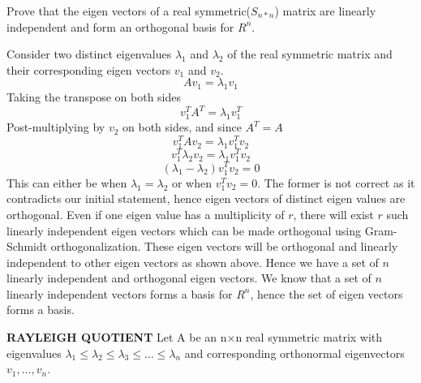 \documentclass[solution,addpoints,12pt]{exam}
\newenvironment{Solution}{\begin{solution}}{\end{solution}}
\begin{document}
\begin{questions}
\question Prove that the eigen vectors of a real symmetric($ S_{n*n}$) matrix are linearly independent and form an orthogonal basis for $R^n$.
\begin{Solution}
Consider two distinct eigenvalues $\lambda_{1}$ and $\lambda_{2}$ of the real symmetric matrix and their corresponding eigen vectors $v_{1}$ and $v_{2}$. 
\[Av_{1} = \lambda_{1}v_{1}\]
Taking the transpose on both sides
\[v_{1}^{T}A^{T} = \lambda_{1}v_{1}^{T}\]
Post-multiplying by $v_{2}$ on both sides, and since $A^{T}=A$
\[v_{1}^{T}Av_{2} = \lambda_{1}v_{1}^{T}v_{2}\]
\[v_{1}^{T}\lambda_{2}v_{2} = \lambda_{1}v_{1}^{T}v_{2}\]
\[(\lambda_{1}-\lambda_{2})v_{1}^{T}v_{2} = 0\]
This can either be when $\lambda_{1}=\lambda_{2}$ or when $v_{1}^{T}v_{2}=0$. The former is not correct as it contradicts our initial statement, hence eigen vectors of distinct eigen values are orthogonal. \newline
Even if one eigen value has a multiplicity of $r$, there will exist $r$ such linearly independent eigen vectors which can be made orthogonal using Gram-Schmidt orthogonalization. These eigen vectors will be orthogonal and linearly independent to other eigen vectors as shown above. Hence we have a set of $n$ linearly independent and orthogonal eigen vectors. We know that a set of $n$ linearly independent vectors forms a basis for $R^n$, hence the set of eigen vectors forms a basis.
\end{Solution}

\question \textbf{RAYLEIGH QUOTIENT}
\newline Let A be an n$ \times $n real symmetric matrix with eigenvalues $\lambda_1 \leq \lambda_2 \leq \lambda_3 \leq \dots \leq  \lambda_n $ and corresponding orthonormal eigenvectors $ v_1, \dots, v_n $.

\begin{parts}

\end{parts}
\end{questions}
\end{document}

